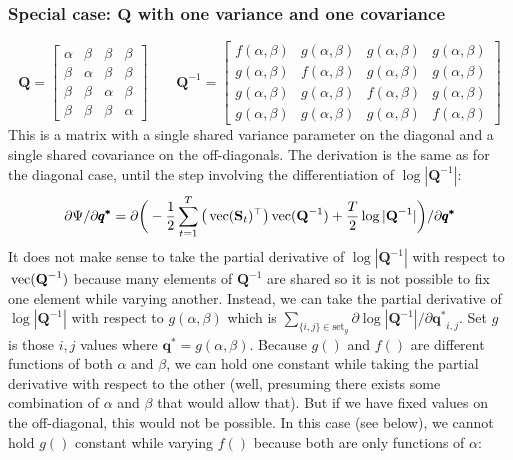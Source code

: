 \documentclass[]{article}
\def\QQ{\mbox{$\mathbf Q$}}	 \def\qq{\mbox{$\mathbf q$}}
\def\SS{\mbox{$\mathbf S$}}
\def\vec{\,\textup{\textrm{vec}}}
\begin{document}
\subsubsection{Special case: $\QQ$ with one variance and one covariance}
\begin{equation*}
\QQ=
\begin{bmatrix}
\alpha&\beta&\beta&\beta\\
\beta&\alpha&\beta&\beta\\
\beta&\beta&\alpha&\beta\\
\beta&\beta&\beta&\alpha
\end{bmatrix}\quad\quad
\QQ^{-1}=
\begin{bmatrix}
f(\alpha,\beta)&g(\alpha,\beta)&g(\alpha,\beta)&g(\alpha,\beta)\\
g(\alpha,\beta)&f(\alpha,\beta)&g(\alpha,\beta)&g(\alpha,\beta)\\
g(\alpha,\beta)&g(\alpha,\beta)&f(\alpha,\beta)&g(\alpha,\beta)\\
g(\alpha,\beta)&g(\alpha,\beta)&g(\alpha,\beta)&f(\alpha,\beta)
\end{bmatrix}
\end{equation*}
This is a matrix with a single shared variance parameter on the diagonal and a single shared covariance on the off-diagonals.  The derivation is the same as for the diagonal case, until the step involving the differentiation of $\log|\QQ^{-1}|$:
\begin{equation}\label{eq:Q.eqvarcov1}
\begin{split}
&\partial\Psi/\partial\pmb{q^{*}} = 
 \partial\bigg(-\frac{1}{2} \sum_{t=1}^T\big(\vec(\SS_t)^\top\big)\vec(\QQ^{-1})
+ \frac{T}{2}\log |\QQ^{-1}|\bigg)/\partial\pmb{q^{*}} \\
\end{split}
\end{equation}
It does not make sense to take the partial derivative of $\log |\QQ^{-1}|$ with respect to $\vec(\QQ^{-1})$ because many elements of $\QQ^{-1}$ are shared so it is not possible to fix one element while varying another.  Instead, we can take the partial derivative of $\log |\QQ^{-1}|$ with respect to $g(\alpha,\beta)$ which is $\sum_{\{i,j\}\in \text{set}_g}\partial\log|\QQ^{-1}|/\partial\pmb{q^{*}}_{i,j}$.  Set $g$ is those $i,j$ values where $\pmb{q^{*}}=g(\alpha,\beta)$.  Because $g()$ and $f()$ are different functions of both $\alpha$ and $\beta$, we can hold one constant while taking the partial derivative with respect to the other (well, presuming there exists some combination of $\alpha$ and $\beta$ that would allow that).  But if we have fixed values on the off-diagonal, this would not be possible.  In this case (see below), we cannot hold $g()$ constant while varying $f()$ because both are only functions of $\alpha$:
\end{document}
